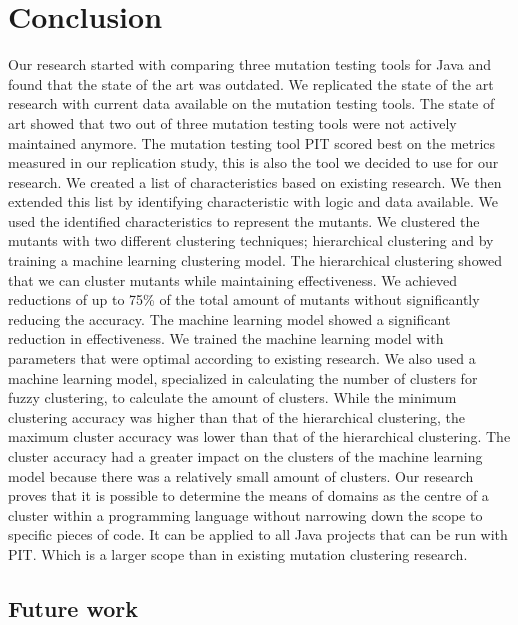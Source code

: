 \documentclass[../main]{subfiles}
\begin{document}
\chapter{Conclusion}
\label{ch:conclusion}
Our research started with comparing three mutation testing tools for Java and found that the state of the art was outdated.
We replicated the state of the art research with current data available on the mutation testing tools.
The state of art showed that two out of three mutation testing tools were not actively maintained anymore.
The mutation testing tool PIT scored best on the metrics measured in our replication study, this is also the tool we decided to use for our research.
\newline
We created a list of characteristics based on existing research. 
We then extended this list by identifying characteristic with logic and data available.
We used the identified characteristics to represent the mutants.
\newline
We clustered the mutants with two different clustering techniques; hierarchical clustering and by training a machine learning clustering model.
The hierarchical clustering showed that we can cluster mutants while maintaining effectiveness.
We achieved reductions of up to 75\% of the total amount of mutants without significantly reducing the accuracy.
\newline
The machine learning model showed a significant reduction in effectiveness.
We trained the machine learning model with parameters that were optimal according to existing research. 
We also used a machine learning model, specialized in calculating the number of clusters for fuzzy clustering, to calculate the amount of clusters.
While the minimum clustering accuracy was higher than that of the hierarchical clustering, the maximum cluster accuracy was lower than that of the hierarchical clustering.
The cluster accuracy had a greater impact on the clusters of the machine learning model because there was a relatively small amount of clusters.
Our research proves that it is possible to determine the means of domains as the centre of a cluster within a programming language without narrowing down the scope to specific pieces of code.
It can be applied to all Java projects that can be run with PIT. 
Which is a larger scope than in existing mutation clustering research.

\section{Future work}
\label{sec:future_work}
\end{document}
